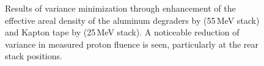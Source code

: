 \begin{figure}
    \centering
    \caption{ Results of variance minimization through enhancement of the effective areal density of the  aluminum degraders by  (55\,MeV stack) and Kapton tape by  (25\,MeV stack). A noticeable reduction of variance in measured proton fluence is seen,  particularly at the  rear stack positions.} 
     \label{fig:fe_variance_mins}
\end{figure}




